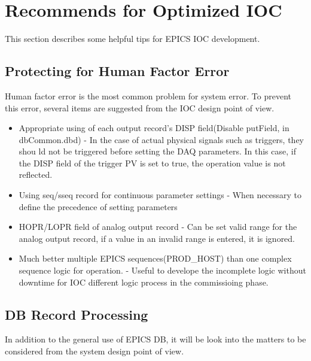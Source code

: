 \documentclass[11pt
  , letterpaper
  , article
  , oneside
  , showtrims
]{memoir}
\begin{document}
\chapter{Recommends for Optimized IOC}
This section describes some helpful tips for EPICS IOC development.


\section{Protecting for Human Factor Error}
Human factor error is the most common problem for system error. To prevent this error, several items are suggested from the IOC design point of view.

\begin{itemize}
	\item Appropriate using of each output record's DISP field(Disable putField, in dbCommon.dbd)
	\newline
	- In the case of actual physical signals such as triggers, they shou ld not be triggered before setting the DAQ parameters. In this case, if the DISP field of the trigger PV is set to true, the operation value is not reflected.
	\item Using seq/sseq record for continuous parameter settings
	\newline
	- When necessary to define the precedence of setting parameters
	\item HOPR/LOPR field of analog output record
	\newline
	- Can be set valid range for the analog output record, if a value in an invalid range is entered, it is ignored.
	\item Much better multiple EPICS sequences(PROD\_HOST) than one complex sequence logic for operation.
	\newline
	- Useful to develope the incomplete logic without downtime for IOC different logic process in the commissioing phase.
\end{itemize}

\section{DB Record Processing}
In addition to the general use of EPICS DB, it will be look into the matters to be considered from the system design point of view.
\end{document}
